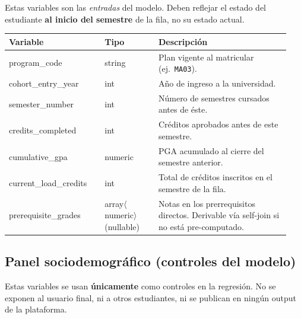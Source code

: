 \documentclass[11pt,a4paper]{article}
\begin{document}
Estas variables son las \emph{entradas} del modelo. Deben reflejar el estado del estudiante \textbf{al inicio del semestre} de la fila, no su estado actual.

\begin{longtable}{@{}>{\ttfamily}p{0.32\linewidth}p{0.18\linewidth}p{0.44\linewidth}@{}}
\toprule
\rmfamily\textbf{Variable} & \textbf{Tipo} & \textbf{Descripción} \\
\midrule
\endhead
program\_code        & string & Plan vigente al matricular (ej.\ \texttt{MA03}). \\
cohort\_entry\_year  & int    & Año de ingreso a la universidad. \\
semester\_number     & int    & Número de semestres cursados antes de éste. \\
credits\_completed   & int    & Créditos aprobados antes de este semestre. \\
cumulative\_gpa      & numeric & PGA acumulado al cierre del semestre anterior. \\
current\_load\_credits & int  & Total de créditos inscritos en el semestre de la fila. \\
prerequisite\_grades & array$\langle$numeric$\rangle$ (nullable) & Notas en los prerrequisitos directos. Derivable vía self-join si no está pre-computado. \\
\bottomrule
\end{longtable}

\subsection{Panel sociodemográfico (controles del modelo)}
\label{sec:vars-demograficas}

Estas variables se usan \textbf{únicamente} como controles en la regresión. No se exponen al usuario final, ni a otros estudiantes, ni se publican en ningún output de la plataforma.
\end{document}
